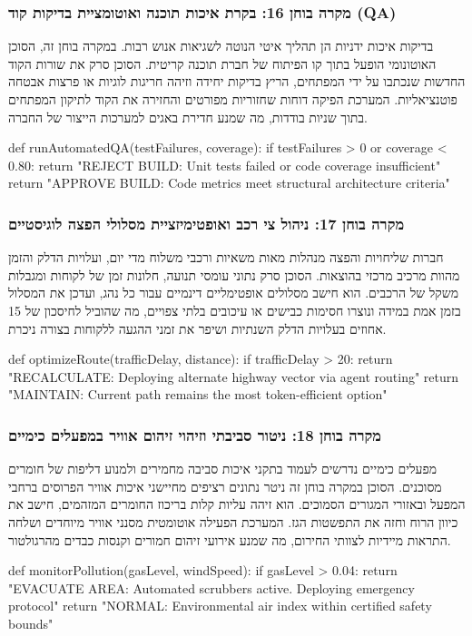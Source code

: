 \documentclass{hebrew-academic-template}
\begin{document}
\subsubsection{מקרה בוחן 16: בקרת איכות תוכנה ואוטומציית בדיקות קוד (QA)}
בדיקות איכות ידניות הן תהליך איטי הנוטה לשגיאות אנוש רבות. במקרה בוחן זה, הסוכן האוטונומי הופעל בתוך קו הפיתוח של חברת תוכנה קריטית. הסוכן סרק את שורות הקוד החדשות שנכתבו על ידי המפתחים, הריץ בדיקות יחידה וזיהה חריגות לוגיות או פרצות אבטחה פוטנציאליות. המערכת הפיקה דוחות שחזוריות מפורטים והחזירה את הקוד לתיקון המפתחים בתוך שניות בודדות, מה שמנע חדירת באגים למערכות הייצור של החברה.
\begin{pythonbox}
def runAutomatedQA(testFailures, coverage):
    if testFailures > 0 or coverage < 0.80:
        return "REJECT BUILD: Unit tests failed or code coverage insufficient"
    return "APPROVE BUILD: Code metrics meet structural architecture criteria"
\end{pythonbox}

\subsubsection{מקרה בוחן 17: ניהול צי רכב ואופטימיזציית מסלולי הפצה לוגיסטיים}
חברות שליחויות והפצה מנהלות מאות משאיות ורכבי משלוח מדי יום, ועלויות הדלק והזמן מהוות מרכיב מרכזי בהוצאות. הסוכן סרק נתוני עומסי תנועה, חלונות זמן של לקוחות ומגבלות משקל של הרכבים. הוא חישב מסלולים אופטימליים דינמיים עבור כל נהג, ועדכן את המסלול בזמן אמת במידה ונוצרו חסימות כבישים או עיכובים בלתי צפויים, מה שהוביל לחיסכון של 15 אחוזים בעלויות הדלק השנתיות ושיפר את זמני ההגעה ללקוחות בצורה ניכרת.
\begin{pythonbox}
def optimizeRoute(trafficDelay, distance):
    if trafficDelay > 20:
        return "RECALCULATE: Deploying alternate highway vector via agent routing"
    return "MAINTAIN: Current path remains the most token-efficient option"
\end{pythonbox}

\subsubsection{מקרה בוחן 18: ניטור סביבתי וזיהוי זיהום אוויר במפעלים כימיים}
מפעלים כימיים נדרשים לעמוד בתקני איכות סביבה מחמירים ולמנוע דליפות של חומרים מסוכנים. הסוכן במקרה בוחן זה ניטר נתונים רציפים מחיישני איכות אוויר הפרוסים ברחבי המפעל ובאזורי המגורים הסמוכים. הוא זיהה עליות קלות בריכוז החומרים המזהמים, חישב את כיוון הרוח וחזה את התפשטות הגז. המערכת הפעילה אוטומטית מסנני אוויר מיוחדים ושלחה התראות מיידיות לצוותי החירום, מה שמנע אירועי זיהום חמורים וקנסות כבדים מהרגולטור.
\begin{pythonbox}
def monitorPollution(gasLevel, windSpeed):
    if gasLevel > 0.04:
        return "EVACUATE AREA: Automated scrubbers active. Deploying emergency protocol"
    return "NORMAL: Environmental air index within certified safety bounds"
\end{pythonbox}
\end{document}
